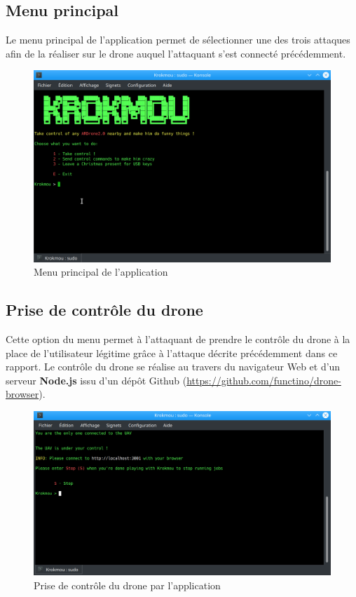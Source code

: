 \subsection{Menu principal}
Le menu principal de l'application permet de sélectionner une des trois attaques afin de la réaliser sur le drone auquel l'attaquant s'est connecté précédemment.

\begin{figure}[!ht]
  \centering
  \includegraphics[scale=0.3]{images/main_menu.png}
  \caption{Menu principal de l'application}
\end{figure}

\subsection{Prise de contrôle du drone}
Cette option du menu permet à l'attaquant de prendre le contrôle du drone à la place de l'utilisateur légitime grâce à l'attaque décrite précédemment dans ce rapport. Le contrôle du drone se réalise au travers du navigateur Web et d'un serveur \textbf{Node.js} issu d'un dépôt Github (\url{https://github.com/functino/drone-browser}).

\begin{figure}[!ht]
  \centering
  \includegraphics[scale=0.3]{images/taking_control.png}
  \caption{Prise de contrôle du drone par l'application}
\end{figure}

